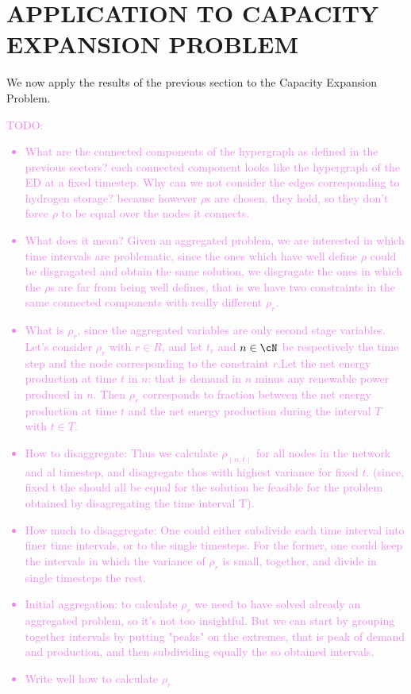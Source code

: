 \section{APPLICATION TO CAPACITY EXPANSION PROBLEM}
{\color{violet}
We now apply the results of the previous section to the Capacity Expansion Problem. 
\textcolor{violet}{
TODO:
\begin{itemize}
  \item What are the connected components of the hypergraph as defined in the previous sectors? each connected component looks like the hypergraph of the ED at a fixed timestep. Why can we not consider the edges corresponding to hydrogen storage? because however \(\rho\)s are chosen, they hold, so they don't force \(\rho\) to be equal over the nodes it connects.
  \item What does it mean? Given an aggregated problem, we are interested in which time intervals are problematic, since the ones which have well define \(\rho\) could be disgragated and obtain the same solution, we disgragate the ones in which the \(\rho\)s are far from being well defines, that is we have two constraints in the same connected components with really different \(\rho_r\).
  \item What is \(\rho_r\), since the aggregated variables are only second stage variables. Let's consider \(\rho_r\) with \(r \in R\), and let \(t_r\) and \(n \in \cN\) be respectively the time step and the node corresponding to the constraint \(r\).Let the net energy production at time \(t\) in \(n\): that is demand in \(n\) minus any renewable power produced in \(n\). Then \(\rho_r\) corresponds to fraction between the net energy production at time \(t\) and the net energy production during the interval \(T\) with \(t \in T\).
  \item How to disaggregate: Thus we calculate \(\rho_(n,t)\) for all nodes in the network and al timestep, and disagregate thos with highest variance for fixed \(t\). (since, fixed t the should all be equal for the solution be feasible for the problem obtained by disagregating the time interval T). \\
  \item How much to disaggregate: One could either subdivide each time interval into finer time intervals, or to the single timesteps. For the former, one could keep the intervals in which the variance of \(\rho_r\) is small, together, and divide in single timesteps the rest.
  \item Initial aggregation: to calculate \(\rho_r\) we need to have solved already an aggregated problem, so it's not too insightful. But we can start by grouping together intervals by putting "peaks" on the extremes, that is peak of demand and production, and then subdividing equally the so obtained intervals.
  \item Write well how to calculate \(\rho_r\)
\end{itemize}
}

}

